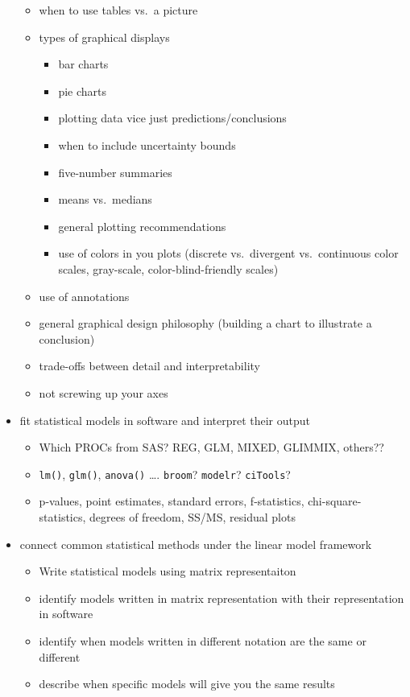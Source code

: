 \documentclass[]{book}
\providecommand{\tightlist}{%
  \setlength{\itemsep}{0pt}\setlength{\parskip}{0pt}}
\theoremstyle{definition}
\theoremstyle{definition}
\theoremstyle{definition}
\theoremstyle{remark}
\begin{document}
\begin{itemize}
  \begin{itemize}
  \tightlist
  \item
    when to use tables vs.~a picture
  \item
    types of graphical displays

    \begin{itemize}
    \tightlist
    \item
      bar charts
    \item
      pie charts
    \item
      plotting data vice just predictions/conclusions
    \item
      when to include uncertainty bounds
    \item
      five-number summaries
    \item
      means vs.~medians
    \item
      general plotting recommendations
    \item
      use of colors in you plots (discrete vs.~divergent vs.~continuous
      color scales, gray-scale, color-blind-friendly scales)
    \end{itemize}
  \item
    use of annotations
  \item
    general graphical design philosophy (building a chart to illustrate
    a conclusion)
  \item
    trade-offs between detail and interpretability
  \item
    not screwing up your axes
  \end{itemize}
\item
  fit statistical models in software and interpret their output

  \begin{itemize}
  \tightlist
  \item
    Which PROCs from SAS? REG, GLM, MIXED, GLIMMIX, others??
  \item
    \texttt{lm()}, \texttt{glm()}, \texttt{anova()} \ldots{}.
    \texttt{broom}? \texttt{modelr}? \texttt{ciTools}?
  \item
    p-values, point estimates, standard errors, f-statistics,
    chi-square-statistics, degrees of freedom, SS/MS, residual plots
  \end{itemize}
\item
  connect common statistical methods under the linear model framework

  \begin{itemize}
  \tightlist
  \item
    Write statistical models using matrix representaiton
  \item
    identify models written in matrix representation with their
    representation in software
  \item
    identify when models written in different notation are the same or
    different
  \item
    describe when specific models will give you the same results


\end{itemize}
\end{itemize}
\end{document}
